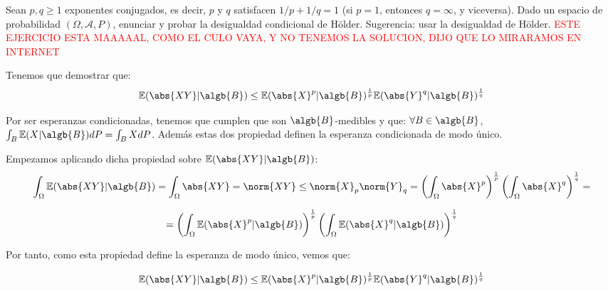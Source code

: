 
\begin{problem}[3] Sean $p,q \ge 1$ exponentes conjugados, es decir, $p$ y $q$ satisfacen
$1/p + 1/q =1$ (si $p=1$, entonces $q = \infty$, y viceversa).
Dado un espacio de probabilidad  $(\Omega, \mathcal{A}, P)$, enunciar y probar la desigualdad condicional de 
H\"older. Sugerencia: usar la desigualdad de H\"older.
\solution
\textcolor{red}{ESTE EJERCICIO ESTA MAAAAAL, COMO EL CULO VAYA, Y NO TENEMOS LA SOLUCION, DIJO QUE LO MIRARAMOS EN INTERNET}

\begin{expla}
Tenemos que demostrar que:
\[
\mathbb{E}(\abs{XY}|\algb{B}) \leq \mathbb{E}(\abs{X}^p|\algb{B})^{\frac{1}{p}} \mathbb{E}(\abs{Y}^q|\algb{B})^{\frac{1}{q}}
\]

Por ser esperanzas condicionadas, tenemos que cumplen que son $\algb{B}$-medibles y que:
$\forall B \in \algb{B}$, $\int_{B}\mathbb{E}(X|\algb{B})dP=\int_{B}XdP$. Además estas dos propiedad definen la esperanza condicionada de modo único.

\end{expla}
Empezamos aplicando dicha propiedad sobre $\mathbb{E}(\abs{XY}|\algb{B})$:
\[
\int_{\Omega}\mathbb{E}(\abs{XY}|\algb{B}) = \int_{\Omega}\abs{XY} = \norm{XY} \leq \norm{X}_p \norm{Y}_q = \left( \int_{\Omega} \abs{X}^p \right)^{\frac{1}{p}} \left( \int_{\Omega} \abs{X}^q \right)^{\frac{1}{q}} =  
\]

\[
= \left( \int_{\Omega} \mathbb{E}(\abs{X}^p|\algb{B}) \right)^{\frac{1}{p}} \left( \int_{\Omega} \mathbb{E}(\abs{X}^q|\algb{B}) \right)^{\frac{1}{q}}
\]

Por tanto, como esta propiedad define la esperanza de modo único, vemos que:

\[
\mathbb{E}(\abs{XY}|\algb{B}) \leq \mathbb{E}(\abs{X}^p|\algb{B})^{\frac{1}{p}} \mathbb{E}(\abs{Y}^q|\algb{B})^{\frac{1}{q}}
\]

\end{problem}


